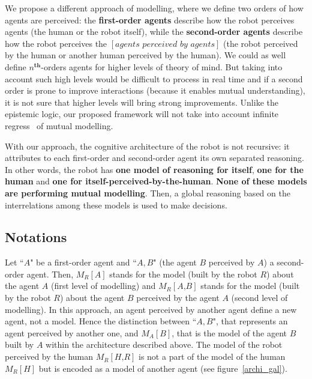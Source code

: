 \documentclass[10pt,a4paper]{article}
\begin{document}
We propose a different approach of modelling, where we define two orders of how agents are perceived: the \textbf{first-order agents} describe how the robot perceives agents (the human or the robot itself), while the \textbf{second-order agents} describe how the robot perceives the $\left[\textit{agents perceived by agents}\right]$ (the robot perceived by the human or another human perceived by the human). We could as well define $\textit{n}^{\textbf{th}}$-orders agents for higher levels of theory of mind. But taking into account such high levels would be difficult to process in real time and if a second order is prone to improve interactions (because it enables mutual understanding), it is not sure that higher levels will bring strong improvements. Unlike the epistemic logic, our proposed framework will not take into account infinite regress~\cite{clark1991grounding} of mutual modelling.

With our approach, the cognitive architecture of the robot is not recursive: it attributes to each first-order and second-order agent its own separated reasoning. In other words, the robot has \textbf{one model of reasoning for itself}, \textbf{one for the human} and \textbf{one for itself-perceived-by-the-human}. \textbf{None of these models are performing mutual modelling}. Then, a global reasoning based on the interrelations among these models is used to make decisions.




\subsection{Notations}\label{not}
Let ``$A$" be a first-order agent and ``$A,B$" (the agent $B$ perceived by $A$) a second-order agent. Then, $M_R\left[\textit{A}\right]$ stands for \textcolor{wine}{the model (built by the robot $R$) about the agent $A$} (first level of modelling) and $M_R\left[\textit{A,B}\right]$ stands for \textcolor{wine}{the model (built by the robot $R$) about the agent $B$ perceived by the agent $A$} (second level of modelling). 
In this approach, an agent perceived by another agent define a new agent, not a model. 
Hence the distinction between ``$A,B$", that represents an agent perceived by another one, and $M_A\left[\textit{B}\right]$, that is the model of the agent $B$ built by $A$ within the architecture described above. 
The model of the robot perceived by the human $M_R\left[\textit{H,R}\right]$ is not a part of the model of the human $M_R\left[\textit{H}\right]$ but is encoded as a model of another agent (see figure~\ref{archi_gal}).
\end{document}
